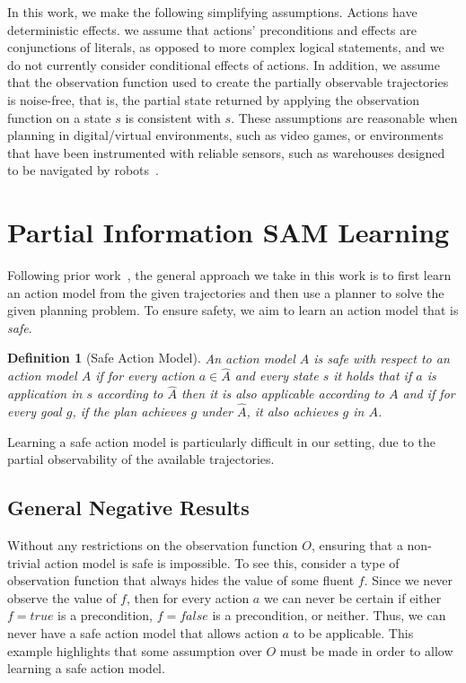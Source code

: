 \documentclass[letterpaper]{article} %
\newtheorem{definition}{Definition}
\newcommand{\true}{\textit{true}}
\newcommand{\false}{\textit{false}}
\begin{document}
In this work, we make the following simplifying assumptions. 
Actions have deterministic effects. 
we assume that actions' preconditions and effects are conjunctions of literals, as opposed to more complex logical statements, and we do not currently consider conditional effects of actions. 
In addition, we assume that the observation function used to create the partially observable trajectories is noise-free, that is, the partial state returned by applying the observation function on a state $s$ is consistent with $s$. 
These assumptions are reasonable when planning in digital/virtual environments, such as video games, or environments that have been instrumented with reliable sensors, such as warehouses designed to be navigated by robots~\cite{li2020lifelong}. 






\section{Partial Information SAM Learning}
Following prior work~\cite{stern2017efficientAndSafe,juba2021safe}, the general approach we take in this work is to first learn an action model from the given trajectories and then use a planner to solve the given planning problem. 
To ensure safety, we aim to learn an action model that is \emph{safe}. 
\begin{definition}[Safe Action Model]
An action model $\hat{A}$ is safe with respect to an action model $A$ 
if for every action $a\in\hat{A}$ and every state $s$ it holds that 
if $a$ is application in $s$ according to $\hat{A}$ then it is also applicable according to $A$ and if for every goal $g$, if the plan achieves $g$ under $\hat{A}$, it also achieves $g$ in $A$. 
\end{definition}
Learning a safe action model is particularly difficult in our setting, due to the partial observability of the available trajectories. 

\subsection{General Negative Results}
Without any restrictions on the observation function $O$, ensuring that a non-trivial action model is safe is impossible. 
To see this, consider a type of observation function that always hides the value of some fluent $f$. 
Since we never observe the value of $f$, then for every action $a$ we can never be certain if either $f=\true$ is a precondition, $f=\false$ is a precondition, or neither.
Thus, we can never have a safe action model that allows action $a$ to be applicable. 
This example highlights that some assumption over $O$ must be made in order to allow learning a safe action model. 
\end{document}
